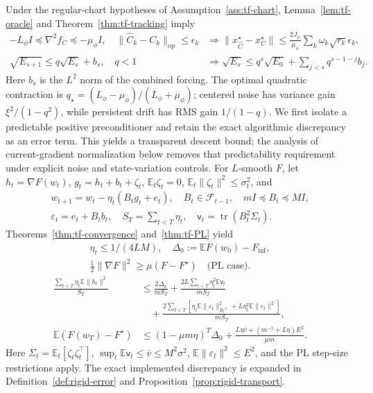 Under the regular-chart hypotheses of Assumption~\ref{ass:tf-chart},
Lemma~\ref{lem:tf-oracle} and Theorem~\ref{thm:tf-tracking} imply
\begin{align}
 -L_\phi I\preceq\nabla^2f_C\preceq-\mu_\phi I,\quad
 \|\widehat C_k-C_k\|_{\mathrm{op}}\le\epsilon_k
 &\Longrightarrow
 \|x_{\widehat C}^\star-x_C^\star\|
 \le\frac{2J_\psi}{\mu_\phi}\sum_k\omega_k\sqrt{r_k}\epsilon_k,\\
 \sqrt{E_{s+1}}\le q\sqrt{E_s}+b_s,\quad q<1
 &\Longrightarrow
 \sqrt{E_s}\le q^s\sqrt{E_0}+\sum_{j<s}q^{s-1-j}b_j.
\end{align}
Here $b_s$ is the $L^2$ norm of the combined forcing. The optimal quadratic
contraction is $q_\star=(L_\phi-\mu_\phi)/(L_\phi+\mu_\phi)$; centered
noise has variance gain $\xi^2/(1-q^2)$, while persistent drift has RMS gain
$1/(1-q)$.
We first isolate a predictable positive preconditioner and retain the exact
algorithmic discrepancy as an error term. This yields a transparent descent
bound; the analysis of current-gradient normalization below removes that
predictability requirement under explicit noise and state-variation controls.
For $L$-smooth $F$, let $h_t=\nabla F(w_t)$,
$g_t=h_t+b_t+\zeta_t$, $\mathbb E_t\zeta_t=0$,
$\mathbb E_t\|\zeta_t\|^2\le\sigma_t^2$, and
\begin{gather}
 w_{t+1}=w_t-\eta_t(B_tg_t+e_t),\quad
 B_t\in\mathcal F_{t-1},\quad mI\preceq B_t\preceq MI,\\
 \varepsilon_t=e_t+B_tb_t,\quad S_T=\sum_{t<T}\eta_t,\quad
 \mathsf v_t=\operatorname{tr}(B_t^2\Sigma_t).
\end{gather}
Theorems~\ref{thm:tf-convergence} and~\ref{thm:tf-PL} yield
\begin{gather}
 \eta_t\le1/(4LM),\quad\Delta_0:=\mathbb E F(w_0)-F_{\inf},\\
 \tfrac12\|\nabla F\|^2\ge\mu(F-F^\star)\quad\text{(PL case)}.
\end{gather}
\begin{align}
 \frac{\sum_{t<T}\eta_t\mathbb E\|h_t\|^2}{S_T}
 &\le\frac{2\Delta_0}{mS_T}
 +\frac{2L\sum_{t<T}\eta_t^2\mathbb E\mathsf v_t}{mS_T}\\
 &\quad+\frac{2\sum_{t<T}\left[\eta_t\mathbb E\|\varepsilon_t\|_{B_t^{-1}}^2
                 +L\eta_t^2\mathbb E\|\varepsilon_t\|^2\right]}{mS_T},\\
 \mathbb E(F(w_T)-F^\star)
 &\le(1-\mu m\eta)^T\Delta_0
 +\frac{L\eta\overline v+(m^{-1}+L\eta)E^2}{\mu m}.
\end{align}
Here $\Sigma_t=\mathbb E_t[\zeta_t\zeta_t^\top]$,
$\sup_t\mathbb E\mathsf v_t\le\overline v\le M^2\sigma^2$,
$\mathbb E\|\varepsilon_t\|^2\le E^2$, and the PL step-size restrictions
apply. The exact implemented discrepancy is expanded in
Definition~\ref{def:rigid-error} and Proposition~\ref{prop:rigid-transport}.

